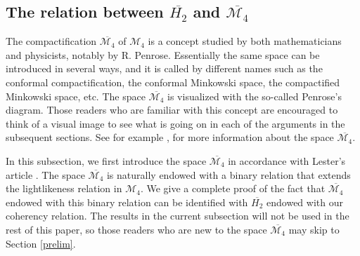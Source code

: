 \documentclass[10pt,a4paper]{amsart}
\providecommand{\index}[1]{}
\newcommand\oH{{\overline{H_2}}}
\theoremstyle{definition}
\theoremstyle{remark}
\numberwithin{subsection}{section}
\numberwithin{equation}{section}
\begin{document}
\subsection{The relation between $\oH$ and $\overline{\mathcal{M}_4}$}\label{ohm4}
The compactification $\overline{\mathcal{M}_4}$ \index{$M_4$2@$\overline{\mathcal{M}_4}$} of $\mathcal{M}_4$ is a concept studied by both mathematicians and physicists, notably by R. Penrose. 
Essentially the same space can be introduced in several ways, and it is called by different names such as the conformal compactification\index{conformal compactification}, the conformal Minkowski space\index{conformal Minkowski space}, the compactified Minkowski space\index{compactified Minkowski space}, etc.
The space $\overline{\mathcal{M}_4}$ is visualized with the so-called Penrose's diagram\index{Penrose's diagram}. 
Those readers who are familiar with this concept are encouraged to think of a visual image to see what is going on in each of the arguments in the subsequent sections. 
See for example  \cite[Section 5.1]{HaE}, \cite{Pe} for more information about the space $\overline{\mathcal{M}_4}$.  

In this subsection, we first introduce the space $\overline{\mathcal{M}_4}$ in accordance with Lester's article \cite{Les0}.
The space $\overline{\mathcal{M}_4}$ is naturally endowed with a binary relation that extends the lightlikeness relation in $\mathcal{M}_4$.
We give a complete proof of the fact that $\overline{\mathcal{M}_4}$ endowed with this binary relation can be identified with $\oH$ endowed with our coherency relation.
The results in the current subsection will not be used in the rest of this paper, so those readers who are new to the space $\overline{\mathcal{M}_4}$ may skip to Section \ref{prelim}.
\end{document}
